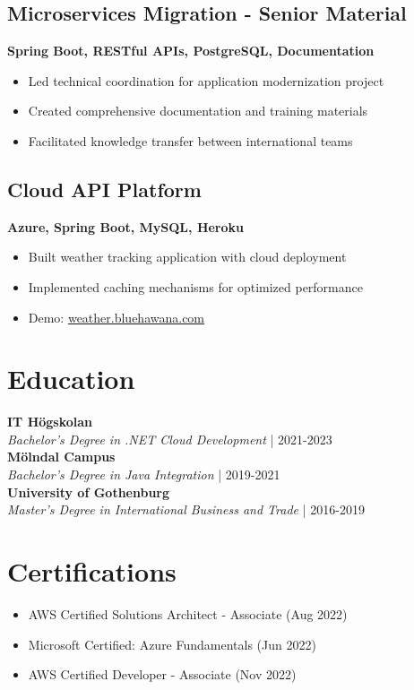 \documentclass[11pt,a4paper]{article}
\begin{document}
\subsection{Microservices Migration - Senior Material}
\textbf{Spring Boot, RESTful APIs, PostgreSQL, Documentation}
\begin{itemize}[noitemsep]
  \item Led technical coordination for application modernization project
  \item Created comprehensive documentation and training materials
  \item Facilitated knowledge transfer between international teams
\end{itemize}

\subsection{Cloud API Platform}
\textbf{Azure, Spring Boot, MySQL, Heroku}
\begin{itemize}[noitemsep]
  \item Built weather tracking application with cloud deployment
  \item Implemented caching mechanisms for optimized performance
  \item Demo: \href{https://weather.bluehawana.com}{weather.bluehawana.com}
\end{itemize}

\vspace{6pt}
\section*{Education}
\textbf{IT Högskolan}\\
\textit{Bachelor's Degree in .NET Cloud Development} | 2021-2023\\
\textbf{Mölndal Campus}\\
\textit{Bachelor's Degree in Java Integration} | 2019-2021\\
\textbf{University of Gothenburg}\\
\textit{Master's Degree in International Business and Trade} | 2016-2019\\

\vspace{6pt}
\section*{Certifications}
\begin{itemize}[noitemsep]
\item AWS Certified Solutions Architect - Associate (Aug 2022)
\item Microsoft Certified: Azure Fundamentals (Jun 2022)
\item AWS Certified Developer - Associate (Nov 2022)
\end{itemize}
\end{document}
